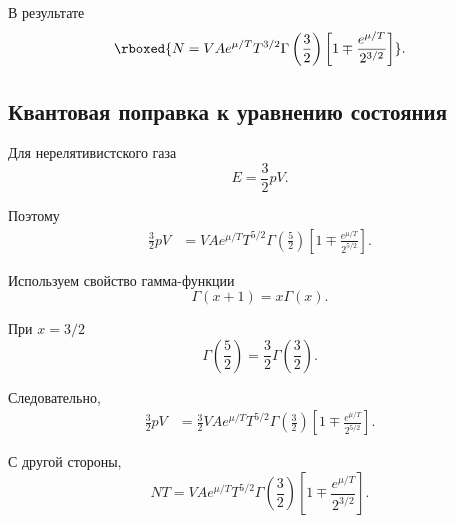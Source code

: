 \documentclass[../final.tex]{subfiles}
\begin{document}
В результате
%
\[
    \rboxed{
        N
        =
        VAe^{\mu/T}
        T^{3/2}
        \Gamma
        \left(
            \frac{3}{2}
        \right)
        \left[
            1
            \mp
            \frac{
                e^{\mu/T}
            }{
                2^{3/2}
            }
        \right]
    }.
\]


\subsection{Квантовая поправка к уравнению состояния}

Для нерелятивистского газа
%
\begin{equation*}
    E
    =
    \frac{3}{2}pV.
\end{equation*}

Поэтому
%
\begin{align*}
    \frac{3}{2}pV
    &=
    VAe^{\mu/T}
    T^{5/2}
    \Gamma
    \left(
        \frac{5}{2}
    \right)
    \left[
        1
        \mp
        \frac{
            e^{\mu/T}
        }{
            2^{5/2}
        }
    \right].
\end{align*}

Используем свойство гамма-функции
%
\begin{equation*}
    \Gamma(x+1)
    =
    x\Gamma(x).
\end{equation*}

При $x=3/2$
%
\begin{equation*}
    \Gamma
    \left(
        \frac{5}{2}
    \right)
    =
    \frac{3}{2}
    \Gamma
    \left(
        \frac{3}{2}
    \right).
\end{equation*}

Следовательно,
%
\begin{align*}
    \frac{3}{2}pV
    &=
    \frac{3}{2}
    VAe^{\mu/T}
    T^{5/2}
    \Gamma
    \left(
        \frac{3}{2}
    \right)
    \left[
        1
        \mp
        \frac{
            e^{\mu/T}
        }{
            2^{5/2}
        }
    \right].
\end{align*}

С другой стороны,
%
\begin{equation*}
    NT
    =
    VAe^{\mu/T}
    T^{5/2}
    \Gamma
    \left(
        \frac{3}{2}
    \right)
    \left[
        1
        \mp
        \frac{
            e^{\mu/T}
        }{
            2^{3/2}
        }
    \right].
\end{equation*}
\end{document}
